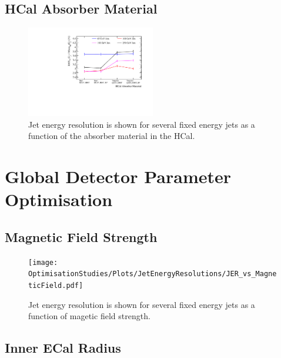 \subsection{HCal Absorber Material}
\label{optstud:sec:hcal:absmat}

\begin{figure}
  \includegraphics[width=0.5\textwidth]{OptimisationStudies/Plots/JetEnergyResolutions/JER_vs_HCalAbsorberMaterial.pdf}
  \caption[Jet energy resolution as a function of the absorber matieral in the HCal.]{Jet energy resolution is shown for several fixed energy jets as a function of the absorber material in the HCal.}
  \label{optstud:fig:hcalabsmat}
\end{figure}

\section{Global Detector Parameter Optimisation}
\label{optstud:sec:global}

\subsection{Magnetic Field Strength}
\label{optstud:sec:glob:bfield}

\begin{figure}
  \texttt{[image: OptimisationStudies/Plots/JetEnergyResolutions/JER\_vs\_MagneticField.pdf]}
  \caption[Jet energy resolution as a function of magnetic field strength.]{Jet energy resolution is shown for several fixed energy jets as a function of magetic field strength.}
  \label{optstud:fig:bfield}
\end{figure}

\subsection{Inner ECal Radius}
\label{optstud:sec:glob:ecalinnerrad}

